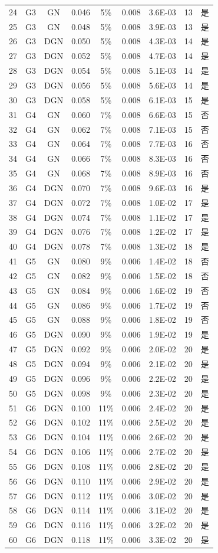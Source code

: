 {\begin{longtable}{ccccccccc}
24&G3&GN&0.046&5\%&0.008&3.6E-03&13&是\\
25&G3&GN&0.048&5\%&0.008&3.9E-03&13&是\\
26&G3&DGN&0.050&5\%&0.008&4.3E-03&14&是\\
27&G3&DGN&0.052&5\%&0.008&4.7E-03&14&是\\
28&G3&DGN&0.054&5\%&0.008&5.1E-03&14&是\\
29&G3&DGN&0.056&5\%&0.008&5.6E-03&14&是\\
30&G3&DGN&0.058&5\%&0.008&6.1E-03&15&是\\
31&G4&GN&0.060&7\%&0.008&6.6E-03&15&否\\
32&G4&GN&0.062&7\%&0.008&7.1E-03&15&否\\
33&G4&GN&0.064&7\%&0.008&7.7E-03&16&否\\
34&G4&GN&0.066&7\%&0.008&8.3E-03&16&否\\
35&G4&GN&0.068&7\%&0.008&8.9E-03&16&否\\
36&G4&DGN&0.070&7\%&0.008&9.6E-03&16&是\\
37&G4&DGN&0.072&7\%&0.008&1.0E-02&17&是\\
38&G4&DGN&0.074&7\%&0.008&1.1E-02&17&是\\
39&G4&DGN&0.076&7\%&0.008&1.2E-02&17&是\\
40&G4&DGN&0.078&7\%&0.008&1.3E-02&18&是\\
41&G5&GN&0.080&9\%&0.006&1.4E-02&18&否\\
42&G5&GN&0.082&9\%&0.006&1.5E-02&18&否\\
43&G5&GN&0.084&9\%&0.006&1.6E-02&19&否\\
44&G5&GN&0.086&9\%&0.006&1.7E-02&19&否\\
45&G5&GN&0.088&9\%&0.006&1.8E-02&19&否\\
46&G5&DGN&0.090&9\%&0.006&1.9E-02&19&是\\
47&G5&DGN&0.092&9\%&0.006&2.0E-02&20&是\\
48&G5&DGN&0.094&9\%&0.006&2.1E-02&20&是\\
49&G5&DGN&0.096&9\%&0.006&2.2E-02&20&是\\
50&G5&DGN&0.098&9\%&0.006&2.3E-02&20&是\\
51&G6&DGN&0.100&11\%&0.006&2.4E-02&20&是\\
52&G6&DGN&0.102&11\%&0.006&2.5E-02&20&是\\
53&G6&DGN&0.104&11\%&0.006&2.6E-02&20&是\\
54&G6&DGN&0.106&11\%&0.006&2.7E-02&20&是\\
55&G6&DGN&0.108&11\%&0.006&2.8E-02&20&是\\
56&G6&DGN&0.110&11\%&0.006&2.9E-02&20&是\\
57&G6&DGN&0.112&11\%&0.006&3.0E-02&20&是\\
58&G6&DGN&0.114&11\%&0.006&3.1E-02&20&是\\
59&G6&DGN&0.116&11\%&0.006&3.2E-02&20&是\\
60&G6&DGN&0.118&11\%&0.006&3.3E-02&20&是\\
\end{longtable}
}
